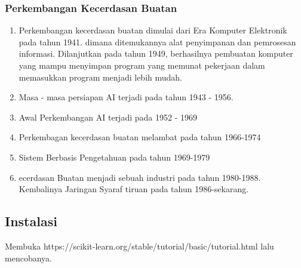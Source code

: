         \subsubsection{Perkembangan Kecerdasan Buatan}
        \begin{enumerate}
            \item Perkembangan kecerdasan buatan dimulai dari Era Komputer Elektronik pada tahun 1941. dimana ditemukannya alat penyimpanan dan pemrosesan informasi. Dilanjutkan pada tahun 1949, berhasilnya pembuatan komputer yang mampu menyimpan program yang memunat pekerjaan dalam memasukkan program menjadi lebih mudah.
            \item Masa - masa persiapan AI terjadi pada tahun 1943 - 1956.
            \item Awal Perkembangan AI terjadi pada 1952 - 1969
            \item Perkembagan kecerdasan buatan melambat pada tahun 1966-1974
            \item Sistem Berbasis Pengetahuan pada tahun 1969-1979
            \item ecerdasan Buatan menjadi sebuah industri pada tahun 1980-1988. Kembalinya Jaringan Syaraf tiruan pada tahun 1986-sekarang.
        \end{enumerate}
    \subsection{Instalasi}
        Membuka  https://scikit-learn.org/stable/tutorial/basic/tutorial.html lalu mencobanya.
